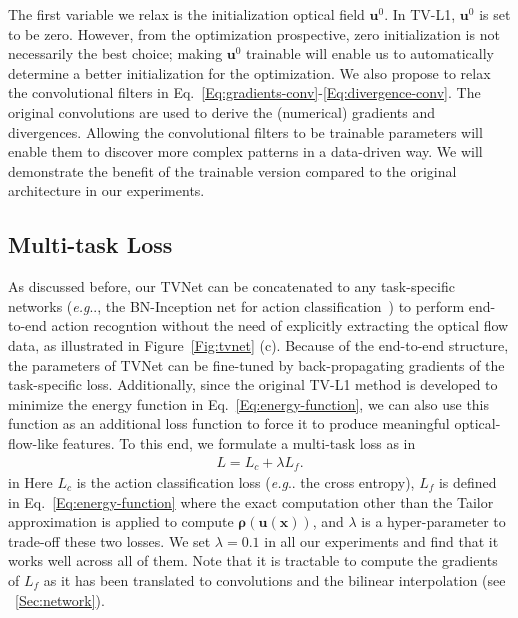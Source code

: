 \documentclass[10pt,twocolumn,letterpaper]{article}
\makeatletter
\DeclareRobustCommand\onedot{\futurelet\@let@token\@onedot}
\def\@onedot{\ifx\@let@token.\else.\null\fi\xspace}
\def\eg{\emph{e.g}\onedot} \def\Eg{\emph{E.g}\onedot}
\def\Vec#1{{\boldsymbol{#1}}}
\makeatother
\begin{document}
The first variable we relax is the initialization optical field $\Vec{u}^0$. In TV-L1, $\Vec{u}^0$ is set to be zero. However, from the optimization prospective, zero initialization is not necessarily the best choice; making $\Vec{u}^0$ trainable will enable us to automatically determine a better initialization for the optimization.
We also propose to relax the convolutional filters in Eq.~\eqref{Eq:gradients-conv}-\eqref{Eq:divergence-conv}. The original convolutions are used to derive the (numerical) gradients and divergences.
Allowing the convolutional filters to be trainable parameters will enable them to discover more complex patterns in a data-driven way. We will demonstrate the benefit of the trainable version compared to the original architecture in our experiments.

\subsection{Multi-task Loss}

As discussed before, our TVNet can be concatenated to any task-specific networks (\eg, the BN-Inception net for action classification~\cite{Wang_ECCV16}) to perform end-to-end action recogntion without the need of explicitly extracting the optical flow data, as illustrated in Figure~\ref{Fig:tvnet} (c).
Because of the end-to-end structure, the parameters of TVNet can be fine-tuned by back-propagating gradients of the task-specific loss.
Additionally, since the original TV-L1 method is developed to minimize the energy function in Eq.~\eqref{Eq:energy-function}, we can also use this function as an additional loss function to force it to produce meaningful optical-flow-like features. To this end, we formulate a multi-task loss as
 in
\begin{eqnarray}
\label{Eq:loss}
L = L_{c} + \lambda L_{f}.
\end{eqnarray}
 in \noindent
Here $L_{c}$ is the action classification loss (\eg the cross entropy), $L_{f}$ is defined in Eq.~\eqref{Eq:energy-function} where the exact computation other than the Tailor approximation is applied to compute $\Vec{\rho}(\Vec{u}(\Vec{x}))$, and $\lambda$ is a hyper-parameter to trade-off these two losses. We  set $\lambda=0.1$ in all our experiments and find that it works well across all of them.
Note that it is tractable to compute the gradients of $L_{f}$ as it has been translated to convolutions and the bilinear interpolation (see \textsection~\ref{Sec:network}).
\end{document}
